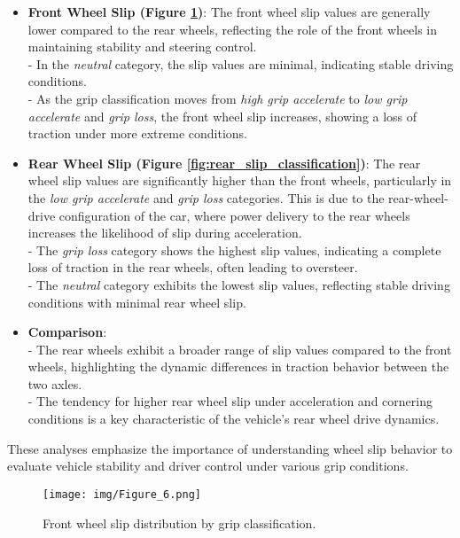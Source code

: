 \documentclass[a4paper,final,12pt]{report}
\begin{document}
\begin{itemize}
    \item \textbf{Front Wheel Slip (Figure \ref{fig:front_slip_classification})}: 
    The front wheel slip values are generally lower compared to the rear wheels, reflecting the role of the front wheels in maintaining stability and steering control.\\
    - In the \textit{neutral} category, the slip values are minimal, indicating stable driving conditions.\\
    - As the grip classification moves from \textit{high grip accelerate} to \textit{low grip accelerate} and \textit{grip loss}, the front wheel slip increases, showing a loss of traction under more extreme conditions.

    \item \textbf{Rear Wheel Slip (Figure \ref{fig:rear_slip_classification})}: 
    The rear wheel slip values are significantly higher than the front wheels, particularly in the \textit{low grip accelerate} and \textit{grip loss} categories. This is due to the rear-wheel-drive configuration of the car, where power delivery to the rear wheels increases the likelihood of slip during acceleration.\\
    - The \textit{grip loss} category shows the highest slip values, indicating a complete loss of traction in the rear wheels, often leading to oversteer.\\
    - The \textit{neutral} category exhibits the lowest slip values, reflecting stable driving conditions with minimal rear wheel slip.

    \item \textbf{Comparison}: \\
    - The rear wheels exhibit a broader range of slip values compared to the front wheels, highlighting the dynamic differences in traction behavior between the two axles.\\
    - The tendency for higher rear wheel slip under acceleration and cornering conditions is a key characteristic of the vehicle's rear wheel drive dynamics.
\end{itemize}

These analyses emphasize the importance of understanding wheel slip behavior to evaluate vehicle stability and driver control under various grip conditions.

\begin{figure}[H]
    \centering
    \texttt{[image: img/Figure\_6.png]}
    \caption{Front wheel slip distribution by grip classification.}
    \label{fig:front_slip_classification}
\end{figure}
\end{document}
